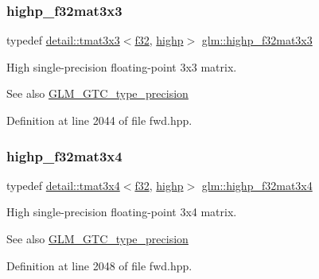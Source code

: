 \subsubsection{\texorpdfstring{highp\+\_\+f32mat3x3}{highp\_f32mat3x3}}
{\footnotesize\ttfamily typedef \hyperlink{structglm_1_1detail_1_1tmat3x3}{detail\+::tmat3x3}$<$\hyperlink{group__gtc__type__precision_ga0ec999b57f5330d9021256e96038df04}{f32}, \hyperlink{namespaceglm_a0f04f086094c747d227af4425893f545ac6f7eab42eacbb10d59a58e95e362074}{highp}$>$ \hyperlink{group__gtc__type__precision_ga334eca23d23aef90972fb20c5b749ca3}{glm\+::highp\+\_\+f32mat3x3}}

High single-\/precision floating-\/point 3x3 matrix. \begin{DoxySeeAlso}{See also}
\hyperlink{group__gtc__type__precision}{G\+L\+M\+\_\+\+G\+T\+C\+\_\+type\+\_\+precision} 
\end{DoxySeeAlso}


Definition at line 2044 of file fwd.\+hpp.

\mbox{\label{group__gtc__type__precision_gaa71f504ecb02f9178026b01013b77ba0}} 
\subsubsection{\texorpdfstring{highp\+\_\+f32mat3x4}{highp\_f32mat3x4}}
{\footnotesize\ttfamily typedef \hyperlink{structglm_1_1detail_1_1tmat3x4}{detail\+::tmat3x4}$<$\hyperlink{group__gtc__type__precision_ga0ec999b57f5330d9021256e96038df04}{f32}, \hyperlink{namespaceglm_a0f04f086094c747d227af4425893f545ac6f7eab42eacbb10d59a58e95e362074}{highp}$>$ \hyperlink{group__gtc__type__precision_gaa71f504ecb02f9178026b01013b77ba0}{glm\+::highp\+\_\+f32mat3x4}}

High single-\/precision floating-\/point 3x4 matrix. \begin{DoxySeeAlso}{See also}
\hyperlink{group__gtc__type__precision}{G\+L\+M\+\_\+\+G\+T\+C\+\_\+type\+\_\+precision} 
\end{DoxySeeAlso}


Definition at line 2048 of file fwd.\+hpp.

\mbox{\label{group__gtc__type__precision_gac14c1bfb647e39d459c7489ede2156cc}} 
